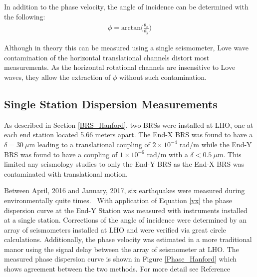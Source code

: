 \documentclass [12pt, proquest]{uwthesis}[2019]
\begin{document}
In addition to the phase velocity, the angle of incidence can be determined with the following:
\begin{align}
\phi=\text{arctan}\bigg(\frac{\theta_x}{\theta_y}\bigg)
\end{align}

Although in theory this can be measured using a single seismometer, Love wave contamination of the horizontal translational channels distort most measurements. As the horizontal rotational channels are insensitive to Love waves, they allow the extraction of $\phi$ without such contamination.  

\subsection{Single Station Dispersion Measurements}
As described in Section \ref{BRS_Hanford}, two BRSs were installed at LHO, one at each end station located 5.66 meters apart. The End-X BRS was found to have a $\delta=30\ \mu \text{m}$ leading to a translational coupling of $2 \times 10^{-4}$ rad/m while the End-Y BRS was found to have a coupling of $1 \times 10^{-6}$ rad/m with a $\delta<0.5\ \mu \text{m}$. This limited any seismology studies to only the End-Y BRS as the End-X BRS was contaminated with translational motion. 

Between April, 2016 and January, 2017, six earthquakes were measured during environmentally quite times.~\cite{tiltSeismology} With application of Equation \ref{vx} the phase dispersion curve at the End-Y Station was measured with instruments installed at a single station. Corrections of the angle of incidence were determined by an array of seismometers installed at LHO and were verified via great circle calculations. Additionally, the phase velocity was estimated in a more traditional manor using the signal delay between the array of seismometer at LHO. The measured phase dispersion curve is shown in Figure \ref{Phase_Hanford} which shows agreement between the two methods. For more detail see Reference~\cite{tiltSeismology}
 
\end{document}
